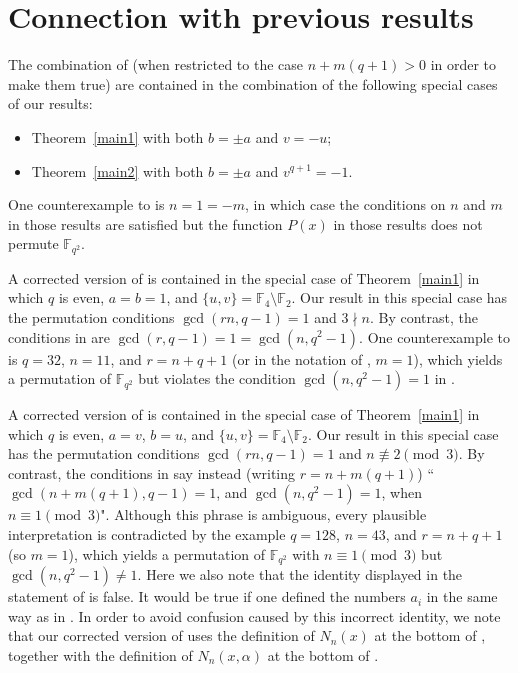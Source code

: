 \documentclass[11pt]{amsart}
\numberwithin{equation}{section}
\theoremstyle{definition}
\newcommand{\F}{\mathbb{F}}
\begin{document}


\section{Connection with previous results} \label{secreferences}

The combination of \cite[Thms.~1 and 2]{FFLW} (when restricted to the case $n+m(q+1)>0$ in order to make them true)
are contained in the combination of the following special cases of our results:
\begin{itemize}
\item Theorem~\ref{main1} with both $b=\pm a$ and $v=-u$; 
\item Theorem~\ref{main2} with both $b=\pm a$ and $v^{q+1}=-1$.
\end{itemize}
One counterexample to \cite[Thms.~1 and 2]{FFLW} is $n=1=-m$, in which case the conditions on $n$ and $m$ in those results are satisfied but the function $P(x)$ in those results does not permute $\F_{q^2}$.

A corrected version of \cite[Thm.~8]{PUW} is contained in the special case of Theorem~\ref{main1} in which $q$ is even, $a=b=1$, and $\{u,v\}=\F_4\setminus\F_2$.  Our result in this special case has the permutation conditions $\gcd(rn,q-1)=1$ and $3\nmid n$.  By contrast, the conditions in \cite[Thm.~8]{PUW} are $\gcd(r,q-1)=1=\gcd(n,q^2-1)$.  One counterexample to \cite[Thm.~8]{PUW} is $q=32$, $n=11$, and $r=n+q+1$ (or in the notation of \cite{PUW}, $m=1$), which yields a permutation of $\F_{q^2}$ but violates the condition $\gcd(n,q^2-1)=1$ in \cite[Thm.~8]{PUW}.

A corrected version of \cite[Thm.~9]{PUW} is contained in the special case of Theorem~\ref{main1} in which $q$ is even, $a=v$, $b=u$, and $\{u,v\}=\F_4\setminus\F_2$.  Our result in this special case has the permutation conditions $\gcd(rn,q-1)=1$ and $n\not\equiv 2 \pmod 3$.  By contrast, the conditions in \cite[Thm.~9]{PUW} say instead (writing $r=n+m(q+1)$) ``$\gcd(n+m(q+1),q-1)=1$, and $\gcd(n,q^2-1)=1$, when $n\equiv 1 \pmod 3$".  Although this phrase is ambiguous, every plausible interpretation is contradicted by the example $q=128$, $n=43$, and $r=n+q+1$ (so $m=1$), which yields a permutation of $\F_{q^2}$ with $n\equiv 1\pmod 3$ but $\gcd(n,q^2-1)\ne 1$.  Here we also note that the identity displayed in the statement of \cite[Thm.~9]{PUW} is false.  It would be true if one defined the numbers $a_i$ in the same way as in \cite[Thm.~8]{PUW}.
In order to avoid confusion caused by this incorrect identity, we note that our corrected version of \cite[Thm.~8]{PUW} uses the definition of $N_n(x)$ at the bottom of \cite[p.~5]{PUW}, together with the definition of $N_n(x,\alpha)$ at the bottom of \cite[p.~4]{PUW}.
\end{document}
